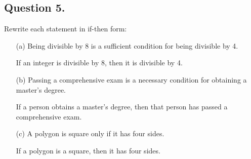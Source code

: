 \documentclass[12pt]{article}
\begin{document}
\subsection*{Question 5.}
Rewrite each statement in if-then form:
\begin{enumerate}
	\item[(a)] Being divisible by 8 is a sufficient condition for being divisible by 4.

	      If an integer is divisible by 8, then it is divisible by 4.

	\item[(b)] Passing a comprehensive exam is a necessary condition for obtaining a master’s degree.

	      If a person obtains a master's degree, then that person has passed a comprehensive exam.
	\item[(c)] A polygon is square only if it has four sides.

	      If a polygon is a square, then it has four sides.
\end{enumerate}
\end{document}
